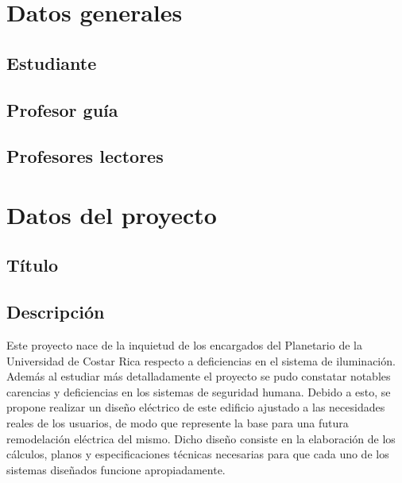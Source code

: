 \documentclass{anteproyecto}
\begin{document}

\encabezado

\section*{Datos generales}

\subsection*{Estudiante}
\estudiante

\subsection*{Profesor guía}
\profesorguia

\subsection*{Profesores lectores}
\profesoreslectores

\section*{Datos del proyecto}

\subsection*{Título}
\eltitulo

\newpage

\subsection*{Descripción}

\ifvacio
	\vspace{4cm}
\else
Este proyecto nace de la inquietud de los encargados del Planetario de la Universidad de Costar Rica respecto a deficiencias en el sistema de iluminación. Además al estudiar más detalladamente el proyecto se pudo constatar notables carencias y deficiencias en los sistemas de seguridad humana. Debido a esto, se propone realizar un diseño eléctrico de este edificio ajustado a las necesidades reales de los usuarios, de modo que represente la base para una futura remodelación eléctrica del mismo. Dicho diseño consiste en la elaboración de los cálculos, planos y especificaciones técnicas necesarias para que cada uno de los sistemas diseñados funcione apropiadamente. 
\end{document}
